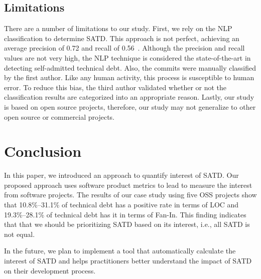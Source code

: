 \documentclass[10pt, conference]{IEEEtran}
\newcommand{\emad}[1]{{\color{red}{\textbf{Emad: [#1]}}}}
\begin{document}
\subsection{Limitations} \label{limitations}
There are a number of limitations to our study. First, we rely on the NLP classification to determine SATD. This approach is not perfect, achieving an average precision of 0.72 and recall of 0.56~\cite{Maldonado_TSE2017}. Although the precision and recall values are not very high, the NLP technique is considered the state-of-the-art in detecting self-admitted technical debt. Also, the commits were manually classified by the first author. Like any human activity, this process is susceptible to human error. To reduce this bias, the third author validated whether or not the classification results are categorized into an appropriate reason. Lastly, our study is based on open source projects, therefore, our study may not generalize to other open source or commercial projects.

\section{Conclusion} \label{sec:conclusion}
In this paper, we introduced an approach to quantify interest of SATD. Our proposed approach uses software product metrics to lead to measure the interest from software projects.
The results of our case study using five OSS projects show that 10.8\%--31.1\% of technical debt has a positive rate in terms of LOC and 19.3\%--28.1\% of technical debt has it in terms of Fan-In. This finding indicates that that we should be prioritizing SATD based on its interest, i.e., all SATD is not equal.

In the future, we plan to implement a tool that automatically calculate 
the interest of SATD and helps practitioners better understand the impact of SATD on their development process.

\balance



\end{document}
